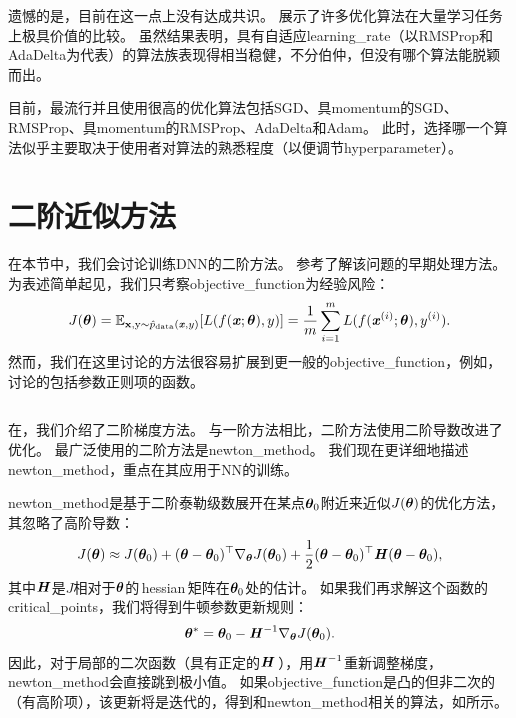 遗憾的是，目前在这一点上没有达成共识。
\cite{Schaul2014_unittests}展示了许多优化算法在大量学习任务上极具价值的比较。
虽然结果表明，具有自适应\gls{learning_rate}（以RMSProp和AdaDelta为代表）的算法族表现得相当稳健，不分伯仲，但没有哪个算法能脱颖而出。

目前，最流行并且使用很高的优化算法包括SGD、具\gls{momentum}的SGD、RMSProp、具\gls{momentum}的RMSProp、AdaDelta和Adam。
此时，选择哪一个算法似乎主要取决于使用者对算法的熟悉程度（以便调节\gls{hyperparameter}）。

\section{二阶近似方法}
\label{sec:approximate_second_order_methods}
在本节中，我们会讨论训练\gls{DNN}的二阶方法。
参考\cite{LeCun+98backprop}了解该问题的早期处理方法。
为表述简单起见，我们只考察\gls{objective_function}为经验风险：
\begin{equation}
    J(\boldsymbol{\theta}) = \mathbb{E}_{\mathbf{x}, \mathrm{y} \sim \hat{p}_{\text{data}}(\boldsymbol{\mathit{x}},y) } [ L(f(\boldsymbol{\mathit{x}}; \boldsymbol{\theta}), y) ] =
\frac{1}{m} \sum_{i=1}^m L(f(\boldsymbol{\mathit{x}}^{(i)}; \boldsymbol{\theta}), y^{(i)}).
\end{equation}
然而，我们在这里讨论的方法很容易扩展到更一般的\gls{objective_function}，例如，讨论的包括参数正则项的函数。


\subsection{}
\label{sec:newton_method}
在，我们介绍了二阶梯度方法。
与一阶方法相比，二阶方法使用二阶导数改进了优化。
最广泛使用的二阶方法是\gls{newton_method}。
我们现在更详细地描述\gls{newton_method}，重点在其应用于\gls{NN}的训练。

\gls{newton_method}是基于二阶泰勒级数展开在某点$\boldsymbol{\theta}_0$附近来近似$J(\boldsymbol{\theta})$的优化方法，其忽略了高阶导数：
\begin{equation}
    J(\boldsymbol{\theta}) \approx J(\boldsymbol{\theta}_0) + (\boldsymbol{\theta} - \boldsymbol{\theta}_0)^\top \nabla_{\boldsymbol{\theta}}   
    J(\boldsymbol{\theta}_0) + \frac{1}{2} (\boldsymbol{\theta} - \boldsymbol{\theta}_0)^\top \boldsymbol{\mathit{H}}(\boldsymbol{\theta} - \boldsymbol{\theta}_0),
\end{equation}
其中$\boldsymbol{\mathit{H}}$是$J$相对于$\boldsymbol{\theta}$的\,\gls{hessian}\,矩阵在$\boldsymbol{\theta}_0$处的估计。
如果我们再求解这个函数的\gls{critical_points}，我们将得到牛顿参数更新规则：
\begin{equation}
    \boldsymbol{\theta}^* = \boldsymbol{\theta}_0 - \boldsymbol{\mathit{H}}^{-1}\nabla_{\boldsymbol{\theta}} J(\boldsymbol{\theta}_0).
\label{eq:8.27}
\end{equation}
因此，对于局部的二次函数（具有正定的$\boldsymbol{\mathit{H}}$\,），用$\boldsymbol{\mathit{H}}^{-1}$重新调整梯度，\gls{newton_method}会直接跳到极小值。
如果\gls{objective_function}是凸的但非二次的（有高阶项），该更新将是迭代的，得到和\gls{newton_method}相关的算法，如所示。

